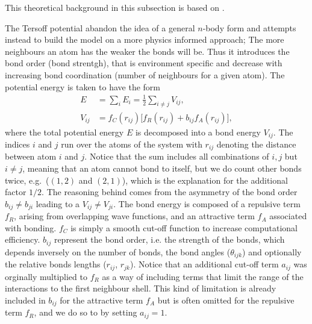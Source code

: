 This theoretical background in this subsection is based on
\cite{docs_lammps_tersoff,PhysRevB.37.6991}.

The Tersoff potential abandon the idea of a general $n$-body form and attempts
instead to build the model on a more physics informed approach; The more
neighbours an atom has the weaker the bonds will be. Thus it introduces the bond
order (bond strentgh), that is environment specific and decrease with increasing
bond coordination (number of neighbours for a given atom). The potential energy
is taken to have the form
\begin{align*}
  E &= \sum_i E_i = \frac{1}{2}\sum_{i \ne j} V_{ij}, \\
  V_{ij} &= f_C(r_{ij}) \big[f_R(r_{ij}) + b_{ij}f_A(r_{ij})  \big],
\end{align*}
where the total potential energy $E$ is decomposed into a bond energy $V_{ij}$.
The indices $i$ and $j$ run over the atoms of the system with $r_{ij}$ denoting
the distance between atom $i$ and $j$. Notice that the sum includes all
combinations of $i,j$ but $i\ne j$, meaning that an atom cannot bond to itself,
but we do count other bonds twice, e.g.\ ($(1,2)$ and $(2,1)$), which is the
explanation for the additional factor $1/2$. The reasoning behind comes from the
asymmetry of the bond order $b_{ij}\ne b_{ji}$ leading to a $V_{ij}\ne V_{ji}$.
The bond energy is composed of a repulsive term $f_R$, arising from overlapping
wave functions, and an attractive term $f_A$ associated with bonding. $f_C$ is
simply a smooth cut-off function to increase computational efficiency. $b_{ij}$
represent the bond order, i.e. the strength of the bonds, which depends
inversely on the number of bonds, the bond angles ($\theta_{ijk}$) and
optionally the relative bonds lengths ($r_{ij}$, $r_{jk}$). Notice that an
additional cut-off term $a_{ij}$ was orginally multiplied to $f_R$ as a way of
including terms that limit the range of the interactions to the first neighbour
shell. This kind of limitation is already included in $b_{ij}$ for the
attractive term $f_A$ but is often omitted for the repulsive term $f_R$, and we
do so to by setting $a_{ij} = 1$. \\
